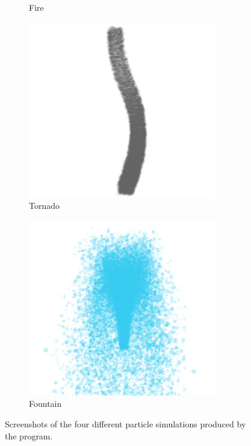 \documentclass[a4paper]{article}
\begin{document}
\begin{figure}[htbp]
\begin{subfigure}[ht]{0.22\textwidth}
        \caption{Fire}
        \label{fig:simulations_fire}
    \end{subfigure}
    \begin{subfigure}[ht]{0.22\textwidth}
        \includegraphics[width=\textwidth]{figures/tornado.png}
        \caption{Tornado}
        \label{fig:simulations_tornado}
    \end{subfigure}
    \begin{subfigure}[ht]{0.22\textwidth}
        \includegraphics[width=\textwidth]{figures/water.png}
        \caption{Fountain}
        \label{fig:simulations_fountain}
    \end{subfigure}

    \caption{Screenshots of the four different particle simulations produced by the program.}
    \label{fig:simulations}
\end{figure}

\begin{multicols*}{2}

\end{multicols*}

\printbibliography
\end{document}
